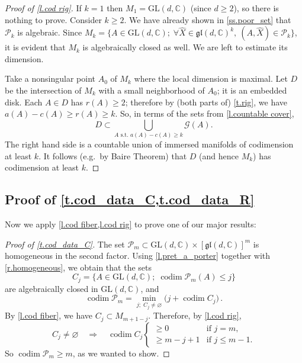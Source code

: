 \documentclass[10pt, a4paper]{amsart}
\theoremstyle{plain}
\theoremstyle{definition}
\theoremstyle{remark}
\theoremstyle{note}
\numberwithin{equation}{section}
\begin{document}
\begin{proof}[Proof of \cref{l.cod rig}]
If $k=1$ then $M_1 = {\mathrm{GL}}(d,{\mathbb{C}})$ (since $d \ge 2$), so there is nothing to prove.
Consider $k \ge 2$.
We have already shown in \cref{ss.poor_set}
that ${\mathcal{P}}_k$ is algebraic.
Since $M_k = \{ A \in {\mathrm{GL}}(d,{\mathbb{C}}) ; \; \forall \hat{X} \in {\mathfrak{gl}}(d,{\mathbb{C}})^{k} , \ (A, \hat{X}) \in {\mathcal{P}}_k \}$,
it is evident that $M_k$ is algebraically closed as well. 
We are left to estimate its dimension.

Take a nonsingular point $A_0$ of $M_k$ where the local dimension is maximal.
Let $D$ be the intersection of $M_k$ 
with a small neighborhood of $A_0$; it is an embedded disk. 
Each $A \in D$ has $r(A) \ge 2$;
therefore by (both parts of) \cref{t.rig},
we have $a(A) - c(A) \ge r(A) \ge k$. 
So, in terms of the sets from \cref{l.countable cover},
$$
D \subset \bigcup_{A \text{ s.t.\ } a(A) - c(A) \ge k} {\mathcal{G}}(A).
$$
The right hand side is a countable union of immersed manifolds of codimension at least $k$.
It follows (e.g.\ by Baire Theorem)
that $D$ (and hence $M_k$) has codimension at least $k$. 
\end{proof}

\subsection{Proof of \cref{t.cod_data_C,t.cod_data_R}}

Now we apply \cref{l.cod fiber,l.cod rig} to prove one of our major results:

\begin{proof}[Proof of \cref{t.cod_data_C}]
The set ${\mathcal{P}}_m \subset {\mathrm{GL}}(d,{\mathbb{C}}) \times [{\mathfrak{gl}}(d,{\mathbb{C}})]^m$
is homogeneous in the second factor.
Using \cref{l.pret_a_porter} together with \cref{r.homogeneous}, we
obtain that the sets 
\begin{equation}\label{e.C_j}
C_j = \big \{A \in {\mathrm{GL}}(d,{\mathbb{C}}) ; \; \operatorname{codim}  {\mathcal{P}}_m (A) \le j \big\}
\end{equation}
are algebraically closed in ${\mathrm{GL}}(d,{\mathbb{C}})$, and
$$
\operatorname{codim} {\mathcal{P}}_m = \min_{j ; \; C_j \neq {\varnothing}} \big( j + \operatorname{codim} C_j \big) \, .
$$
By \cref{l.cod fiber}, we have $C_j \subset M_{m+1-j}$.
Therefore, by \cref{l.cod rig},
\begin{equation}\label{e.ultraimportant}
C_j \neq {\varnothing} \quad \Rightarrow \quad
\operatorname{codim} C_j 
\begin{cases}
\ge 0      &\text{if $j=m$,} \\
\ge m-j+1  &\text{if $j \le m-1$.}
\end{cases}
\end{equation}
So $\operatorname{codim} {\mathcal{P}}_m \ge m$, as we wanted to show.
\end{proof}
\end{document}
